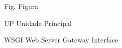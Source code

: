 \begin{siglas}
  \item[Fig.] Figura
  \item[UP] Unidade Principal
  \item[WSGI] Web Server Gateway Interface

\end{siglas}
